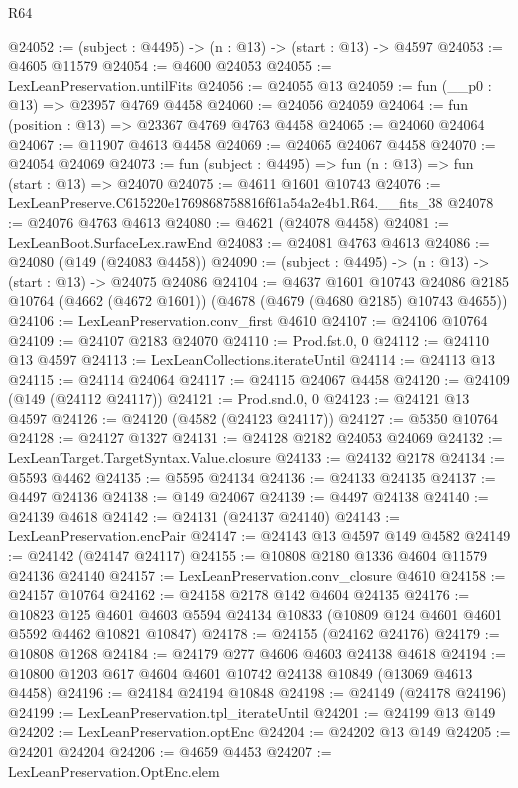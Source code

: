 \begin{lexlean}{R64}
\begin{coremodule}
@24052 := (subject : @4495) -> (n : @13) -> (start : @13) -> @4597
@24053 := @4605 @11579
@24054 := @4600 @24053
@24055 := LexLeanPreservation.untilFits
@24056 := @24055 @13
@24059 := fun (__p0 : @13) => @23957 @4769 @4458
@24060 := @24056 @24059
@24064 := fun (position : @13) => @23367 @4769 @4763 @4458
@24065 := @24060 @24064
@24067 := @11907 @4613 @4458
@24069 := @24065 @24067 @4458
@24070 := @24054 @24069
@24073 := fun (subject : @4495) => fun (n : @13) => fun (start : @13) => @24070
@24075 := @4611 @1601 @10743
@24076 := LexLeanPreserve.C615220e1769868758816f61a54a2e4b1.R64.__fits_38
@24078 := @24076 @4763 @4613
@24080 := @4621 (@24078 @4458)
@24081 := LexLeanBoot.SurfaceLex.rawEnd
@24083 := @24081 @4763 @4613
@24086 := @24080 (@149 (@24083 @4458))
@24090 := (subject : @4495) -> (n : @13) -> (start : @13) -> @24075 @24086
@24104 := @4637
    @1601
    @10743
    @24086
    @2185
    @10764
    (@4662 (@4672 @1601))
    (@4678 (@4679 (@4680 @2185) @10743 @4655))
@24106 := LexLeanPreservation.conv_first @4610
@24107 := @24106 @10764
@24109 := @24107 @2183 @24070
@24110 := Prod.fst.{0, 0}
@24112 := @24110 @13 @4597
@24113 := LexLeanCollections.iterateUntil
@24114 := @24113 @13
@24115 := @24114 @24064
@24117 := @24115 @24067 @4458
@24120 := @24109 (@149 (@24112 @24117))
@24121 := Prod.snd.{0, 0}
@24123 := @24121 @13 @4597
@24126 := @24120 (@4582 (@24123 @24117))
@24127 := @5350 @10764
@24128 := @24127 @1327
@24131 := @24128 @2182 @24053 @24069
@24132 := LexLeanTarget.TargetSyntax.Value.closure
@24133 := @24132 @2178
@24134 := @5593 @4462
@24135 := @5595 @24134
@24136 := @24133 @24135
@24137 := @4497 @24136
@24138 := @149 @24067
@24139 := @4497 @24138
@24140 := @24139 @4618
@24142 := @24131 (@24137 @24140)
@24143 := LexLeanPreservation.encPair
@24147 := @24143 @13 @4597 @149 @4582
@24149 := @24142 (@24147 @24117)
@24155 := @10808 @2180 @1336 @4604 @11579 @24136 @24140
@24157 := LexLeanPreservation.conv_closure @4610
@24158 := @24157 @10764
@24162 := @24158 @2178 @142 @4604 @24135
@24176 := @10823
    @125
    @4601
    @4603
    @5594
    @24134
    @10833
    (@10809 @124 @4601 @4601 @5592 @4462 @10821 @10847)
@24178 := @24155 (@24162 @24176)
@24179 := @10808 @1268
@24184 := @24179 @277 @4606 @4603 @24138 @4618
@24194 := @10800 @1203 @617 @4604 @4601 @10742 @24138 @10849 (@13069 @4613 @4458)
@24196 := @24184 @24194 @10848
@24198 := @24149 (@24178 @24196)
@24199 := LexLeanPreservation.tpl_iterateUntil
@24201 := @24199 @13 @149
@24202 := LexLeanPreservation.optEnc
@24204 := @24202 @13 @149
@24205 := @24201 @24204
@24206 := @4659 @4453
@24207 := LexLeanPreservation.OptEnc.elem

\end{coremodule}
\end{lexlean}
